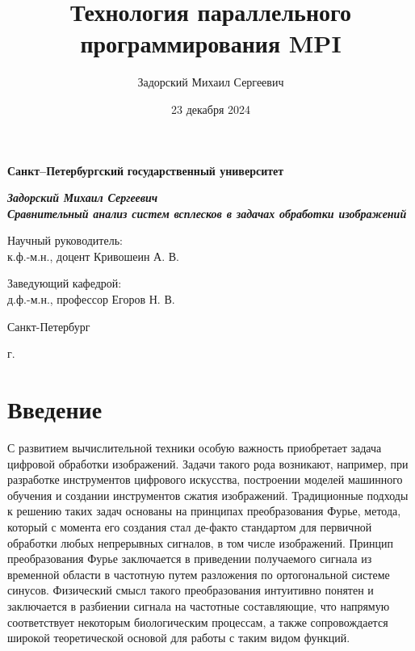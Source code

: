 \documentclass[a4paper,article,14pt]{extarticle}
\author{Задорский Михаил Сергеевич}
\date{23 декабря 2024}
\title{Технология параллельного программирования MPI}
\begin{document}
\begin{titlepage}
\begin{center}

\textbf{Санкт--Петербургский}
\textbf{государственный университет}

\vspace{35mm}

\textbf{\textit{\large Задорский Михаил Сергеевич}} \\[8mm]
\textbf{\textit{\large Сравнительный анализ систем всплесков в задачах обработки изображений}}

\vspace{20mm}


\begin{flushright}
\begin{minipage}[t]{0.65\textwidth}
{Научный руководитель:} \\
к.ф.-м.н., доцент Кривошеин А. В.
\vspace{10mm}

{Заведующий кафедрой:} \\
д.ф.-м.н., профессор Егоров Н. В.
\end{minipage}
\end{flushright}

\vfill 

{Санкт-Петербург}
\par{\the\year{} г.}
\end{center}
\end{titlepage}
\restoregeometry
\addtocounter{page}{1}
\tableofcontents

\pagebreak
\section{Введение}

С развитием вычислительной техники особую важность приобретает задача цифровой обработки изображений. Задачи такого рода возникают, например, при разработке инструментов цифрового искусства, построении моделей машинного обучения и создании инструментов сжатия изображений. Традиционные подходы к решению таких задач основаны на принципах преобразования Фурье, метода, который с момента его создания стал де-факто стандартом для первичной обработки любых непрерывных сигналов, в том числе изображений. Принцип преобразования Фурье заключается в приведении получаемого сигнала из временной области в частотную путем разложения по ортогональной системе синусов. Физический смысл такого преобразования интуитивно понятен и заключается в разбиении сигнала на частотные составляющие, что напрямую соответствует некоторым биологическим процессам, а также сопровождается широкой теоретической основой для работы с таким видом функций.
\end{document}
